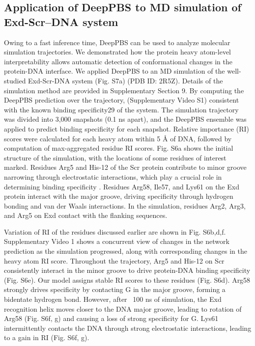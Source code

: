 \subsection{Application of DeepPBS to MD simulation of Exd-Scr–DNA system}

Owing to a fast inference time, DeepPBS can be used to analyze molecular simulation trajectories. We demonstrated how the protein heavy atom-level interpretability allows automatic detection of conformational changes in the protein-DNA interface. We applied DeepPBS to an MD simulation of the well-studied Exd-Scr-DNA system (Fig. S7a) (PDB ID: 2R5Z)\citep{Abe2015, Chiu2022, Ghoshdastidar2022, Slattery2011}. Details of the simulation method are provided in Supplementary Section 9. By computing the DeepPBS prediction over the trajectory, (Supplementary Video S1) consistent with the known binding specificity29 of the system. The
simulation trajectory was divided into 3,000 snapshots (0.1 ns apart), and the DeepPBS ensemble was applied to predict binding specificity for each snapshot. Relative importance (RI) scores were calculated for each heavy atom within 5 Å of DNA, followed by computation of max-aggregated residue RI scores. Fig. S6a shows the initial structure of the simulation, with the locations of some residues of interest marked. Residues Arg5 and His-12 of the Scr protein contribute to minor groove narrowing through electrostatic interactions, which play a crucial role in determining binding specificity \citep{Joshi2007}. 
Residues Arg58, Ile57, and Lys61 on the Exd protein interact with the major groove, driving specificity through hydrogen bonding and van der Waals interactions. In the simulation, residues Arg2, Arg3, and Arg5 on Exd contact with the flanking sequences. 

Variation of RI of the residues discussed earlier are shown in Fig. S6b,d,f. Supplementary Video 1 shows a concurrent view of changes in the network prediction as the simulation progressed, along with corresponding changes in the heavy atom RI score. Throughout the trajectory, Arg5 and His-12 on Scr consistently interact in the minor groove to drive protein-DNA binding specificity (Fig. S6e). Our model assigns stable RI scores to these residues (Fig. S6d). Arg58 strongly drives specificity by contacting G in the major groove, forming a bidentate hydrogen bond. However, after ~100 ns of simulation, the Exd recognition helix moves closer to the DNA major groove, leading to rotation of Arg58 (Fig. S6f, g) and causing a loss of strong specificity for G. Lys61 intermittently contacts the DNA through strong electrostatic interactions, leading to a gain in RI (Fig. S6f, g). 

